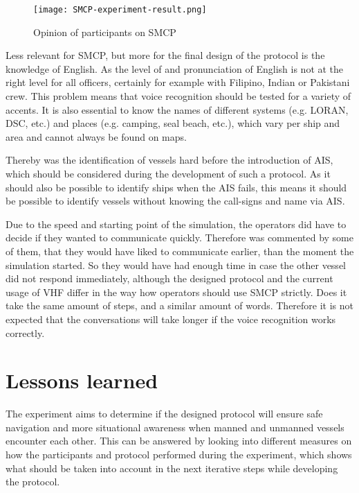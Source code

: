 \begin{figure}[h]
	\centering
	\texttt{[image: SMCP-experiment-result.png]}
	\caption{Opinion of participants on SMCP}
	\label{fig:SMCP-experiment-result}
\end{figure}

Less relevant for \ac{SMCP}, but more for the final design of the protocol is the knowledge of English. As the level of and pronunciation of English is not at the right level for all officers, certainly for example with Filipino, Indian or Pakistani crew. This problem means that voice recognition should be tested for a variety of accents. It is also essential to know the names of different systems (e.g. LORAN, DSC, etc.) and places (e.g. camping, seal beach, etc.), which vary per ship and area and cannot always be found on maps.

Thereby was the identification of vessels hard before the introduction of AIS, which should be considered during the development of such a protocol. As it should also be possible to identify ships when the \ac{AIS} fails, this means it should be possible to identify vessels without knowing the call-signs and name via \ac{AIS}.

Due to the speed and starting point of the simulation, the operators did have to decide if they wanted to communicate quickly. Therefore was commented by some of them, that they would have liked to communicate earlier, than the moment the simulation started. So they would have had enough time in case the other vessel did not respond immediately, although the designed protocol and the current usage of \ac{VHF} differ in the way how operators should use SMCP strictly. Does it take the same amount of steps, and a similar amount of words. Therefore it is not expected that the conversations will take longer if the voice recognition works correctly.

\section{Lessons learned}
The experiment aims to determine if the designed protocol will ensure safe navigation and more situational awareness when manned and unmanned vessels encounter each other. This can be answered by looking into different measures on how the participants and protocol performed during the experiment, which shows what should be taken into account in the next iterative steps while developing the protocol.


